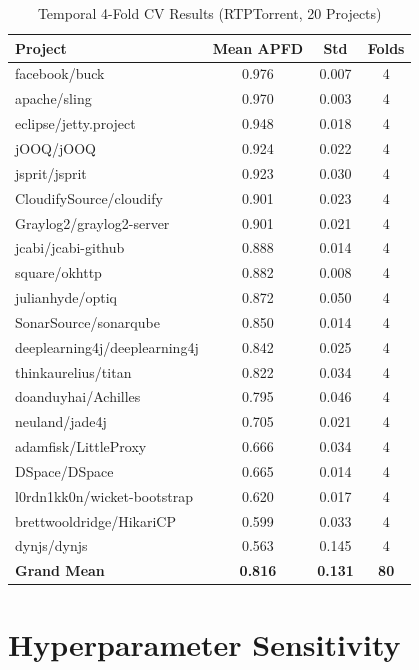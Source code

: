\documentclass[10pt,journal,compsoc]{IEEEtran}
\begin{document}
\begin{table}[!t]
\centering
\caption{Temporal 4-Fold CV Results (RTPTorrent, 20 Projects)}
\label{tab:temporal_cv_rtptorrent}
\footnotesize
\begin{tabular}{lccc}
\toprule
\textbf{Project} & \textbf{Mean APFD} & \textbf{Std} & \textbf{Folds} \\
\midrule
facebook/buck & 0.976 & 0.007 & 4 \\
apache/sling & 0.970 & 0.003 & 4 \\
eclipse/jetty.project & 0.948 & 0.018 & 4 \\
jOOQ/jOOQ & 0.924 & 0.022 & 4 \\
jsprit/jsprit & 0.923 & 0.030 & 4 \\
CloudifySource/cloudify & 0.901 & 0.023 & 4 \\
Graylog2/graylog2-server & 0.901 & 0.021 & 4 \\
jcabi/jcabi-github & 0.888 & 0.014 & 4 \\
square/okhttp & 0.882 & 0.008 & 4 \\
julianhyde/optiq & 0.872 & 0.050 & 4 \\
SonarSource/sonarqube & 0.850 & 0.014 & 4 \\
deeplearning4j/deeplearning4j & 0.842 & 0.025 & 4 \\
thinkaurelius/titan & 0.822 & 0.034 & 4 \\
doanduyhai/Achilles & 0.795 & 0.046 & 4 \\
neuland/jade4j & 0.705 & 0.021 & 4 \\
adamfisk/LittleProxy & 0.666 & 0.034 & 4 \\
DSpace/DSpace & 0.665 & 0.014 & 4 \\
l0rdn1kk0n/wicket-bootstrap & 0.620 & 0.017 & 4 \\
brettwooldridge/HikariCP & 0.599 & 0.033 & 4 \\
dynjs/dynjs & 0.563 & 0.145 & 4 \\
\midrule
\textbf{Grand Mean} & \textbf{0.816} & \textbf{0.131} & \textbf{80} \\
\bottomrule
\end{tabular}
\end{table}

\clearpage

\section{Hyperparameter Sensitivity}
\end{document}

